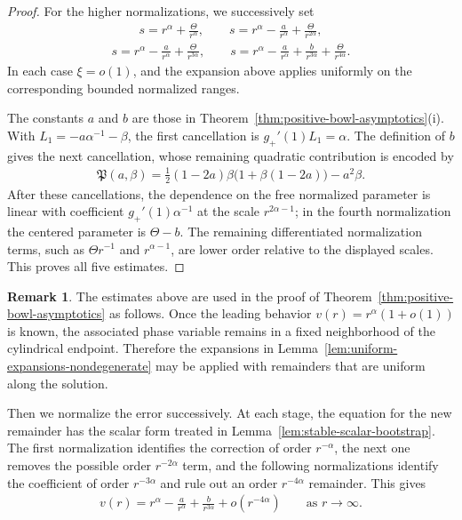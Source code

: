 \documentclass{amsart}
\theoremstyle{plain}
\theoremstyle{mainintrothm}
\theoremstyle{definition}
\newtheorem{remark}[theorem]{Remark}
\begin{document}
\begin{proof}
		For the higher normalizations, we successively set
		\begin{align*}
			s
			=
			r^\alpha+
			\frac{\Theta}{r^\alpha},
			\qquad
			s
			=
			r^\alpha-
			\frac{a}{r^\alpha}
			+
			\frac{\Theta}{r^{2\alpha}},
		\end{align*}
		\begin{align*}
			s
			=
			r^\alpha-
			\frac{a}{r^\alpha}
			+
			\frac{\Theta}{r^{3\alpha}},
			\qquad
			s
			=
			r^\alpha-
			\frac{a}{r^\alpha}
			+
			\frac{b}{r^{3\alpha}}
			+
			\frac{\Theta}{r^{4\alpha}}.
		\end{align*}
		In each case $\xi=o(1)$, and the expansion above applies uniformly on the
		corresponding bounded normalized ranges.
		
		\medskip
		
		The constants $a$ and $b$ are those in
		Theorem~\ref{thm:positive-bowl-asymptotics}\textup{(i)}.  With
		$L_1=-a\alpha^{-1}-\beta$, the first cancellation is
		$g_+'(1)L_1=\alpha$.  The definition of $b$ gives the next cancellation,
		whose remaining quadratic contribution is encoded by
		\begin{align*}
			\mathfrak P(a,\beta)
			=
			\frac{1}{2}(1-2a)\beta\bigl(1+\beta(1-2a)\bigr)
			-
			a^2\beta.
		\end{align*}
		After these cancellations, the dependence on the free normalized parameter
		is linear with coefficient $g_+'(1)\alpha^{-1}$ at the scale
		$r^{2\alpha-1}$; in the fourth normalization the centered parameter is
		$\Theta-b$.  The remaining differentiated normalization terms, such as
		$\Theta r^{-1}$ and $r^{\alpha-1}$, are lower order relative to the displayed
		scales.  This proves all five estimates.
	\end{proof}
	
	
	\begin{remark}
		\label{rem:nondegenerate-expansion-organization}
		The estimates above are used in the proof of
		Theorem~\ref{thm:positive-bowl-asymptotics} as follows.  Once the leading
		behavior $v(r)=r^\alpha(1+o(1))$ is known, the associated phase variable
		remains in a fixed neighborhood of the cylindrical endpoint.  Therefore the
		expansions in Lemma~\ref{lem:uniform-expansions-nondegenerate} may be applied
		with remainders that are uniform along the solution.
		
\medskip

		Then we normalize the error successively.  At each stage, the equation for the
		new remainder has the scalar form treated in
		Lemma~\ref{lem:stable-scalar-bootstrap}.  The first normalization identifies
		the correction of order $r^{-\alpha}$, the next one removes the possible order
		$r^{-2\alpha}$ term, and the following normalizations identify the coefficient
		of order $r^{-3\alpha}$ and rule out an order $r^{-4\alpha}$ remainder.  This
		gives
		\begin{align*}
			v(r)
			=
			r^\alpha
			-
			\frac{a}{r^\alpha}
			+
			\frac{b}{r^{3\alpha}}
			+
			o(r^{-4\alpha})
			\qquad\text{as }r\to\infty .
		\end{align*}
	
		
	\end{remark}
	
\end{document}
